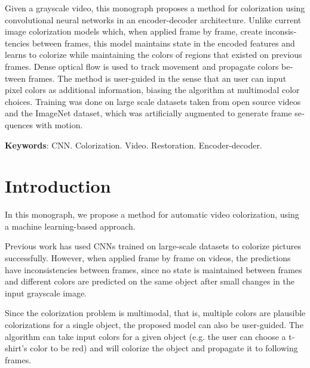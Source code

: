\documentclass[12pt,openright,oneside,a4paper,english]{abntex2}
\begin{document}
\begin{otherlanguage}{english}
\begin{resumo}
Given a grayscale video, this monograph proposes a method for colorization using convolutional neural networks in an encoder-decoder architecture. Unlike current image colorization models which, when applied frame by frame, create inconsistencies between frames, this model maintains state in the encoded features and learns to colorize while maintaining the colors of regions that existed on previous frames. Dense optical flow is used to track movement and propagate colors between frames. The method is user-guided in the sense that an user can input pixel colors as additional information, biasing the algorithm at multimodal color choices. Training was done on large scale datasets taken from open source videos and the ImageNet dataset, which was artificially augmented to generate frame sequences with motion.
\vspace{\onelineskip}

\noindent
\textbf{Keywords}: CNN. Colorization. Video. Restoration. Encoder-decoder.
\end{resumo}


\cleardoublepage

\tableofcontents

\maketitle

\chapter{Introduction}
In this monograph, we propose a method for automatic video colorization, using a machine learning-based approach.

Previous work \cite{colorful} has used CNNs trained on large-scale datasets to colorize pictures successfully. However, when applied frame by frame on videos, the predictions have inconsistencies between frames, since no state is maintained between frames and different colors are predicted on the same object after small changes in the input grayscale image.

Since the colorization problem is multimodal, that is, multiple colors are plausible colorizations for a single object, the proposed model can also be user-guided. The algorithm can take input colors for a given object (e.g. the user can choose a t-shirt's color to be red) and will colorize the object and propagate it to following frames.


\end{otherlanguage}
\end{document}
